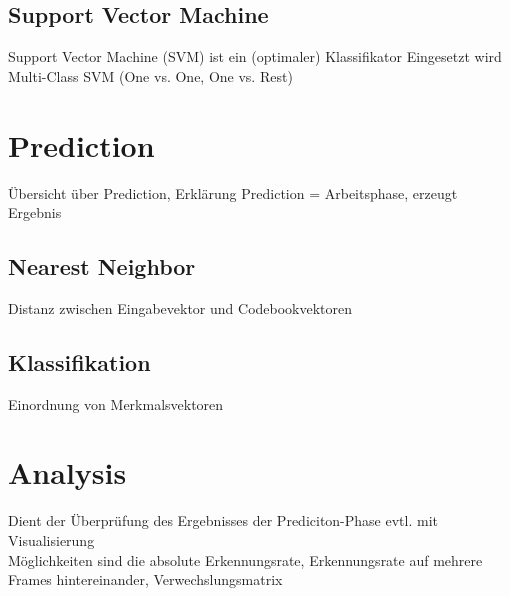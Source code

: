 \subsection{Support Vector Machine}
Support Vector Machine (SVM) ist ein (optimaler) Klassifikator
Eingesetzt wird Multi-Class SVM (One vs. One, One vs. Rest)

\section{Prediction}
Übersicht über Prediction, Erklärung Prediction = Arbeitsphase, erzeugt Ergebnis
\subsection{Nearest Neighbor}
Distanz zwischen Eingabevektor und Codebookvektoren
\subsection{Klassifikation}
Einordnung von Merkmalsvektoren

\section{Analysis}
Dient der Überprüfung des Ergebnisses der Prediciton-Phase evtl. mit Visualisierung\\
Möglichkeiten sind die absolute Erkennungsrate, Erkennungsrate auf mehrere Frames hintereinander, Verwechslungsmatrix
